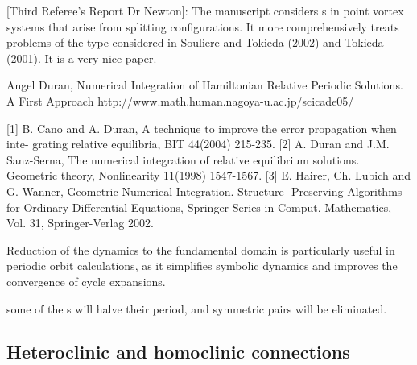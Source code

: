 [Third Referee's Report Dr Newton]:
The manuscript considers {\rpo s} in point vortex systems
that arise from splitting {\reqv} configurations. It more
comprehensively treats problems of the type considered in Souliere and
Tokieda (2002) and Tokieda (2001). It is a very nice paper.

Angel Duran,
Numerical Integration of Hamiltonian 
Relative Periodic Solutions. A First Approach
http://www.math.human.nagoya-u.ac.jp/scicade05/

    [1] B. Cano and A. Duran, A technique to improve the error propagation when inte-
grating relative equilibria, BIT 44(2004) 215-235.
    [2] A. Duran and J.M. Sanz-Serna, The numerical integration of relative equilibrium
solutions. Geometric theory, Nonlinearity 11(1998) 1547-1567.
    [3] E. Hairer, Ch. Lubich and G. Wanner, Geometric Numerical Integration. Structure-
Preserving Algorithms for Ordinary Differential Equations, Springer Series in Comput.
Mathematics, Vol. 31, Springer-Verlag 2002.


\bigskip

Reduction of the dynamics to the fundamental domain is particularly
useful in periodic orbit calculations, as it simplifies symbolic dynamics
and improves the convergence of cycle expansions\cite{CvitaEckardt}.

some of the \po s will
halve their period, and symmetric pairs will be eliminated.

\subsection*{Heteroclinic and homoclinic connections}
%

